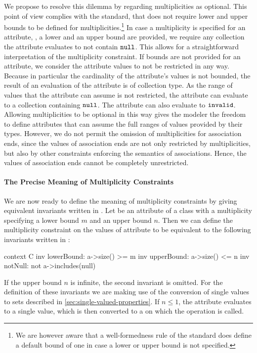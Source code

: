 We propose to resolve this dilemma by regarding multiplicities as optional. This
point of view complies with the \UML standard, that does not require lower and
upper bounds to be defined for multiplicities.\footnote{We are however aware
  that a well-formedness rule of the \UML standard does define a default bound
  of one in case a lower or upper bound is not specified.} In case a
multiplicity is specified for an attribute, \ie, a lower and an upper bound
are provided, we require any collection the attribute evaluates to not
contain $\mathtt{null}$. This allows for a straightforward interpretation of
the multiplicity constraint. If bounds are not provided for an attribute, we
consider the attribute values to not be restricted in any way. Because in
particular the cardinality of the attribute's values is not bounded, the result
of an evaluation of the attribute is of collection type. As the range of values
that the attribute can assume is not restricted, the attribute can evaluate to a
collection containing $\mathtt{null}$. The attribute can also evaluate to
$\mathtt{invalid}$. Allowing multiplicities to be optional in this way gives
the modeler the freedom to define attributes that can assume the full ranges of
values provided by their types. However, we do not permit the omission of
multiplicities for association ends, since the values of association ends are
not only restricted by multiplicities, but also by other constraints enforcing
the semantics of associations. Hence, the values of association ends cannot be
completely unrestricted.

\paragraph{The Precise Meaning of Multiplicity Constraints}
We are now ready to define the meaning of multiplicity constraints by giving
equivalent invariants written in \OCL\@. Let  be an attribute of a
class  with a multiplicity specifying a lower bound $m$ and an
upper bound $n$. Then we can define the multiplicity constraint on the values of
attribute  to be equivalent to the following invariants written in
\OCL:
\begin{ocl}
context C inv lowerBound: a->size() >= m
          inv upperBound: a->size() <= n
          inv notNull: not a->includes(null)
\end{ocl}
If the upper bound $n$ is infinite, the second invariant is omitted. For the
definition of these invariants we are making use of the conversion of single
values to sets described in \autoref{sec:single-valued-properties}. If $n
\leq 1$, the attribute  evaluates to a single value, which is then
converted to a  on which the  operation is
called.

